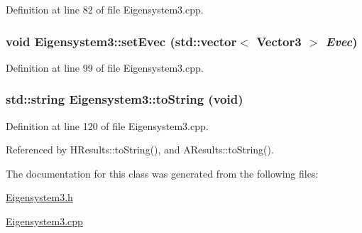 Definition at line 82 of file Eigensystem3.cpp.

\subsubsection[{setEvec}]{\setlength{\rightskip}{0pt plus 5cm}void Eigensystem3::setEvec (std::vector$<$ {\bf Vector3} $>$ {\em Evec})}\label{classEigensystem3_ad15598642fbd83f34cad73a301b43b89}


Definition at line 99 of file Eigensystem3.cpp.

\subsubsection[{toString}]{\setlength{\rightskip}{0pt plus 5cm}std::string Eigensystem3::toString (void)}\label{classEigensystem3_a1e3d57b18699eacbf3de9e07fdfacd1f}


Definition at line 120 of file Eigensystem3.cpp.



Referenced by HResults::toString(), and AResults::toString().



The documentation for this class was generated from the following files:\begin{DoxyCompactItemize}
\item 
\hyperlink{Eigensystem3_8h}{Eigensystem3.h}\item 
\hyperlink{Eigensystem3_8cpp}{Eigensystem3.cpp}\end{DoxyCompactItemize}
